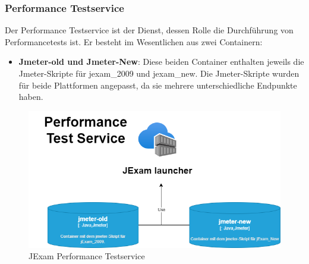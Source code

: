 \subsubsection{Performance Testservice}

Der Performance Testservice ist der Dienst, dessen Rolle die
Durchführung von Performancetests ist. Er besteht im Wesentlichen
aus zwei Containern:

\begin{itemize}
    \setlength\itemsep{1em}

    \item[] \textbf{Jmeter-old und Jmeter-New}: Diese beiden Container enthalten jeweils
    die Jmeter-Skripte für \gls{jexam_2009} und \gls{jexam_new}. Die
    Jmeter-Skripte wurden für beide Plattformen angepasst, da sie
    mehrere unterschiedliche Endpunkte haben.

\end{itemize}

\begin{figure}[H]
    \centering
    \includegraphics[scale=0.6]{images/performance.drawio}
    \caption{JExam Performance Testservice} \label{fig:per}
\end{figure}